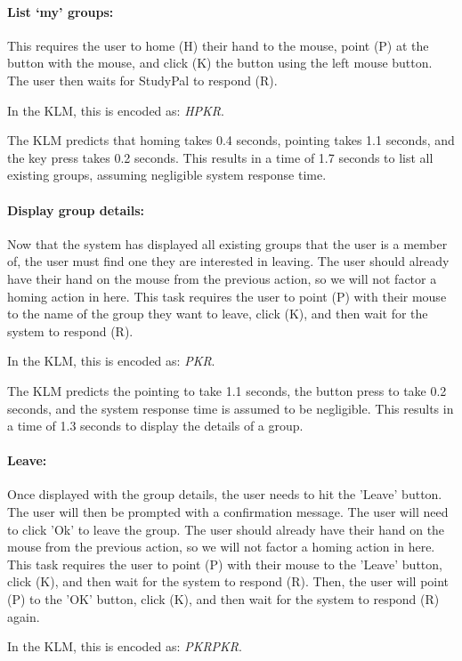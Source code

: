 \documentclass[conference]{IEEEtran}
\begin{document}
\paragraph{List `my' groups:}
This requires the user to home (H) their hand to the mouse, point (P) at the button with the mouse, and click (K) the button using the left mouse button.
The user then waits for StudyPal to respond (R).

In the KLM, this is encoded as: \emph{HPKR}.

The KLM predicts that homing takes 0.4 seconds, pointing takes 1.1 seconds, and the key press takes 0.2 seconds.
This results in a time of 1.7 seconds to list all existing groups, assuming negligible system response time.

\paragraph{Display group details:}
Now that the system has displayed all existing groups that the user is a member of, the user must find one they are interested in leaving.
The user should already have their hand on the mouse from the previous action, so we will not factor a homing action in here.
This task requires the user to point (P) with their mouse to the name of the group they want to leave, click (K), and then wait for the system to respond (R).

In the KLM, this is encoded as: \emph{PKR}.

The KLM predicts the pointing to take 1.1 seconds, the button press to take 0.2 seconds, and the system response time is assumed to be negligible.
This results in a time of 1.3 seconds to display the details of a group.

\paragraph{Leave:}
Once displayed with the group details, the user needs to hit the 'Leave' button. The user will then be prompted with a confirmation message.  The user will need to click 'Ok' to leave the group. The user should already have their hand on the mouse from the previous action, so we will not factor a homing action in here.
This task requires the user to point (P) with their mouse to the 'Leave' button, click (K), and then wait for the system to respond (R). Then, the user will point (P) to the 'OK' button, click (K), and then wait for the system to respond (R) again.

In the KLM, this is encoded as: \emph{PKRPKR}.
\end{document}
